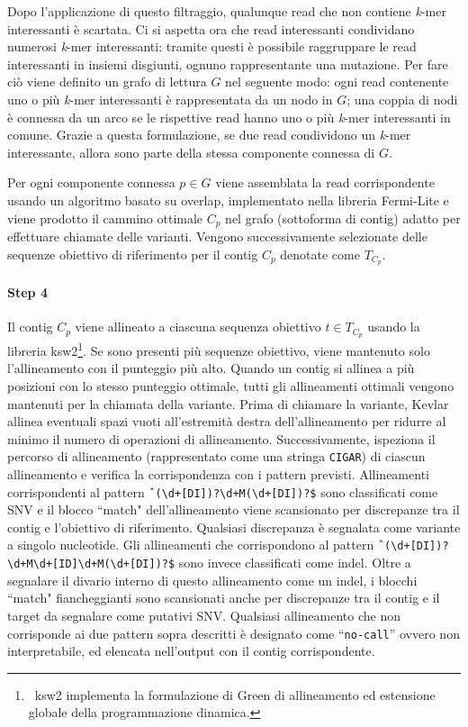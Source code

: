 \documentclass[../main.tex]{subfiles}
\begin{document}
Dopo l'applicazione di questo filtraggio, qualunque read che non contiene \textit{k}-mer interessanti è scartata. Ci si aspetta ora che read interessanti condividano numerosi \textit{k}-mer interessanti: tramite questi è possibile raggruppare le read interessanti in insiemi disgiunti, ognuno rappresentante una mutazione. Per fare ciò viene definito un grafo di lettura $G$ nel seguente modo: ogni read contenente uno o più \textit{k}-mer interessanti è rappresentata da un nodo in $G$; una coppia di nodi è connessa da un arco se le rispettive read hanno uno o più \textit{k}-mer interessanti in comune. Grazie a questa formulazione, se due read condividono un \textit{k}-mer interessante, allora sono parte della stessa componente connessa di $G$. 

Per ogni componente connessa $p\in G$ viene assemblata la read corrispondente usando un algoritmo basato su overlap, implementato nella libreria Fermi-Lite e viene prodotto il cammino ottimale $C_p$ nel grafo (sottoforma di contig) adatto per effettuare chiamate delle varianti. Vengono successivamente selezionate delle sequenze obiettivo di riferimento per il contig $C_p$ denotate come $T_{C_p}$.

\paragraph{Step 4} Il contig $C_p$ viene allineato a ciascuna sequenza obiettivo $t \in T_{C_p}$ usando la libreria ksw2\footnote{\ ksw2 implementa la formulazione di Green di allineamento ed estensione globale della programmazione dinamica.}. 
Se sono presenti più sequenze obiettivo, viene mantenuto solo l'allineamento con il punteggio più alto. Quando un contig si allinea a più posizioni con lo stesso punteggio ottimale, tutti gli allineamenti ottimali vengono mantenuti per la chiamata della variante.
Prima di chiamare la variante, Kevlar allinea eventuali spazi vuoti all'estremità destra dell'allineamento per ridurre al minimo il numero di operazioni di allineamento. Successivamente, ispeziona il percorso di allineamento (rappresentato come una stringa \texttt{CIGAR}) di ciascun allineamento e verifica la corrispondenza con i pattern previsti. Allineamenti corrispondenti al pattern \verb|ˆ(\d+[DI])?\d+M(\d+[DI])?$| sono classificati come SNV e il blocco ``match" dell'allineamento viene scansionato per discrepanze tra il contig e l'obiettivo di riferimento. Qualsiasi discrepanza è segnalata come variante a singolo nucleotide. Gli allineamenti che corrispondono al pattern \verb|ˆ(\d+[DI])?\d+M\d+[ID]\d+M(\d+[DI])?$| sono invece classificati come indel. Oltre a segnalare il divario interno di questo allineamento come un indel, i blocchi ``match" fiancheggianti sono
scansionati anche per discrepanze tra il contig e il target da segnalare come putativi SNV. Qualsiasi allineamento che non corrisponde ai due pattern sopra descritti è designato come ``\texttt{no-call}'' ovvero non interpretabile, ed elencata nell'output con il contig corrispondente. 
\end{document}
